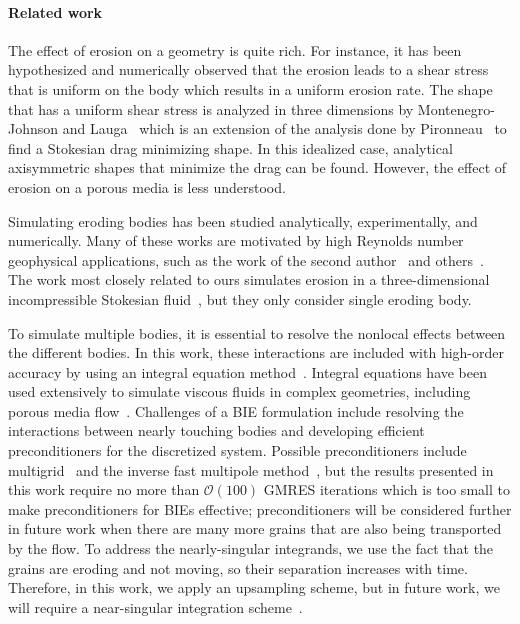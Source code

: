 \documentclass[preprint, 10pt]{elsarticle}
\begin{document}
\paragraph{Related work} The effect of erosion on a geometry is quite
rich.  For instance, it has been hypothesized and numerically observed
that the erosion leads to a shear stress that is uniform on the body
which results in a uniform erosion rate.  The shape that has a uniform
shear stress is analyzed in three dimensions by Montenegro-Johnson and
Lauga~\cite{mon-lau2015} which is an extension of the analysis done by
Pironneau~\cite{pir1973} to find a Stokesian drag minimizing shape. 
In this idealized case, analytical axisymmetric shapes that minimize the
drag can be found.  However, the effect of erosion on a porous media is
less understood.

Simulating eroding bodies has been studied analytically, experimentally, and numerically.  Many of these works are motivated by high Reynolds number geophysical applications, such as the work of the second author~\cite{moo-ris-chi-zha-she2013, ris-moo-chi-she-zha2012, moore2017riemann} and others~\cite{par-izu2000, lag2000, coh-dev-sey-yi-szy-rot2015, han1969, Rothman2012, hewett2017evolution, ristroph2018sculpting, lopez2018cfd, lachaussee2018competitive, cohen2016erosion}.  The work most closely related to ours simulates erosion in a three-dimensional incompressible Stokesian fluid~\cite{mit-spa2016}, but they only consider single eroding body. 


To simulate multiple bodies, it is essential to resolve the nonlocal
effects between the different bodies.  In this work, these interactions
are included with high-order accuracy by using an integral equation
method~\cite{poz1992}.  Integral equations have been used extensively to
simulate viscous fluids in complex geometries, including porous media
flow~\cite{dea-qua-bir-jua2018, bar-mar-vee-zha2016}. Challenges of a
BIE formulation include resolving the interactions between nearly
touching bodies and developing efficient preconditioners for the
discretized system.  Possible preconditioners include
multigrid~\cite{qua-bir2015a} and the inverse fast multipole
method~\cite{qua-cou-dar2018}, but the results presented in this work
require no more than $\mathcal{O}(100)$ GMRES iterations which is too
small to make preconditioners for BIEs effective; preconditioners will
be considered further in future work when there are many more grains
that are also being transported by the flow.  To address the
nearly-singular integrands, we use the fact that the grains are eroding
and not moving, so their separation increases with time.  Therefore, in
this work, we apply an upsampling scheme, but in future work, we will
require a near-singular integration scheme~\cite{qua-bir2014a,
klo-bar-gre-one2013, bar-wu-vee2015, hel-oja2008a, bea-lai2001}.
\end{document}
